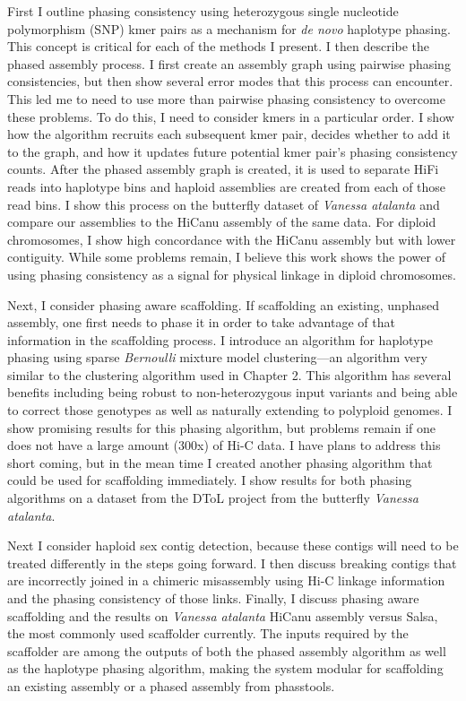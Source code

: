 \par{
 First I outline phasing consistency using heterozygous single nucleotide polymorphism (SNP) kmer pairs as a mechanism for \textit{de novo} haplotype phasing. This concept is critical for each of the methods I present. I then describe the phased assembly process. I first create an assembly graph using pairwise phasing consistencies, but then show several error modes that this process can encounter. This led me to need to use more than pairwise phasing consistency to overcome these problems. To do this, I need to consider kmers in a particular order. I show how the algorithm recruits each subsequent kmer pair, decides whether to add it to the graph, and how it updates future potential kmer pair's phasing consistency counts. After the phased assembly graph is created, it is used to separate HiFi reads into haplotype bins and haploid assemblies are created from each of those read bins. I show this process on the butterfly dataset of \textit{Vanessa atalanta} and compare our assemblies to the HiCanu assembly of the same data. For diploid chromosomes, I show high concordance with the HiCanu assembly but with lower contiguity. While some problems remain, I believe this work shows the power of using phasing consistency as a signal for physical linkage in diploid chromosomes.
}
 
 \par{
Next, I consider phasing aware scaffolding. If scaffolding an existing, unphased assembly, one first needs to phase it in order to take advantage of that information in the scaffolding process. I introduce an algorithm for haplotype phasing using sparse \textit{Bernoulli} mixture model clustering---an algorithm very similar to the clustering algorithm used in Chapter 2. This algorithm has several benefits including being robust to non-heterozygous input variants and being able to correct those genotypes as well as naturally extending to polyploid genomes. I show promising results for this phasing algorithm, but problems remain if one does not have a large amount (300x) of Hi-C data. I have plans to address this short coming, but in the mean time I created another phasing algorithm that could be used for scaffolding immediately.  I show results for both phasing algorithms on a dataset from the DToL project from the butterfly \textit{Vanessa atalanta}. 
}

\par{
Next I consider haploid sex contig detection, because these contigs will need to be treated differently in the steps going forward. I then discuss breaking contigs that are incorrectly joined in a chimeric misassembly using Hi-C linkage information and the phasing consistency of those links. Finally, I discuss phasing aware scaffolding and the results on \textit{Vanessa atalanta} HiCanu assembly versus Salsa, the most commonly used scaffolder currently. The inputs required by the scaffolder are among the outputs of both the phased assembly algorithm as well as the haplotype phasing algorithm, making the system modular for scaffolding an existing assembly or a phased assembly from phasstools.
}


